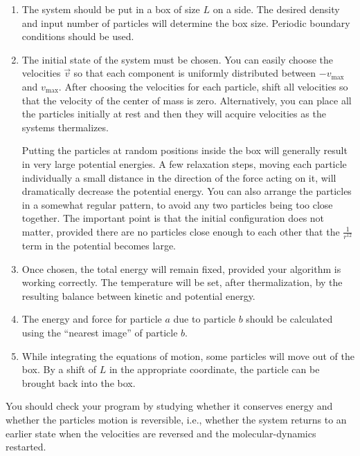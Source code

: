 \begin{enumerate}
    \item The system should be put in a box of size $L$ on a side. The desired density and
          input number of particles will determine the box size. Periodic boundary
          conditions should be used.
    \item The initial state of the system must be chosen. You can easily choose the
          velocities $\vec{v}$ so that each component is uniformly distributed between
          $-v_\text{max}$ and $v_\text{max}$. After choosing the velocities for each
          particle, shift all velocities so that the velocity of the center of mass is zero.
          Alternatively, you can place all the particles initially at rest and then they
          will acquire velocities as the systems thermalizes.

          Putting the particles at random positions inside the box will generally result in
          very large potential energies. A few relaxation steps, moving each particle
          individually a small distance in the direction of the force acting on it, will
          dramatically decrease the potential energy. You can also arrange the particles in
          a somewhat regular pattern, to avoid any two particles being too close together.
          The important point is that the initial configuration does not matter, provided
          there are no particles close enough to each other that the $\frac{ 1 }{ r^{12} }$
          term in the potential becomes large.
    \item Once chosen, the total energy will remain fixed, provided your algorithm is
          working correctly. The temperature will be set, after thermalization, by the
          resulting balance between kinetic and potential energy.
    \item The energy and force for particle $a$ due to particle $b$ should be calculated
          using the ``nearest image'' of particle $b$.
    \item While integrating the equations of motion, some particles will move out of the
          box. By a shift of $L$ in the appropriate coordinate, the particle can be brought
          back into the box.
\end{enumerate}

You should check your program by studying whether it conserves energy and whether the
particles motion is reversible, i.e., whether the system returns to an earlier state when
the velocities are reversed and the molecular-dynamics restarted.

